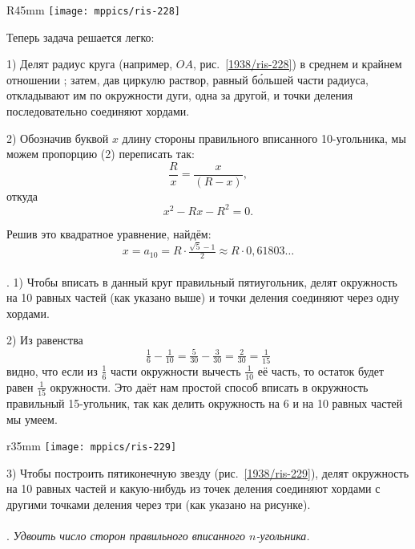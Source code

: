 \begin{wrapfigure}{R}{45mm}
\centering
\texttt{[image: mppics/ris-228]}
\caption{}\label{1938/ris-228}
\end{wrapfigure}

Теперь задача решается легко:

1) Делят радиус круга (например, $OA$, рис.~\ref{1938/ris-228}) в среднем и крайнем отношении%
;
затем, дав циркулю раствор, равный б\'{о}льшей части радиуса, откладывают им по окружности дуги, одна за другой, и точки деления последовательно соединяют хордами.

2) Обозначив буквой $x$ длину стороны правильного вписанного 10-угольника, мы можем пропорцию (2) переписать так:
\[\frac Rx=\frac x{(R-x)},\]
откуда
\[x^2-Rx-R^2=0.\]

Решив это квадратное уравнение, найдём:
\[x=a_{10}=R\cdot\tfrac{\sqrt5-1}{2}\approx R \cdot  0{,}61803\dots\]

\paragraph{}\label{1938/223}
\mbox{.}
1) Чтобы вписать в данный круг правильный пятиугольник, делят окружность на 10 равных частей (как указано выше) и точки деления соединяют через одну хордами.

2) Из равенства
\[\tfrac16-\tfrac1{10}=\tfrac5{30}-\tfrac3{30}=\tfrac2{30}=\tfrac1{15}\]
видно, что если из $\tfrac16$ части окружности вычесть $\tfrac1{10}$ её часть, то остаток будет равен $\tfrac1{15}$ окружности.
Это даёт нам простой способ вписать в окружность правильный 15-угольник, так как делить окружность на 6 и на 10 равных частей мы умеем.

\begin{wrapfigure}{r}{35mm}
\centering
\texttt{[image: mppics/ris-229]}
\caption{}\label{1938/ris-229}
\end{wrapfigure}

3) Чтобы построить пятиконечную звезду (рис.~\ref{1938/ris-229}), делят окружность на 10 равных частей и какую-нибудь из точек деления соединяют хордами с другими точками деления через три (как указано на рисунке).

\paragraph{}\label{1938/224}
\mbox{.}
\emph{Удвоить число сторон правильного вписанного $n$-угольника.}

